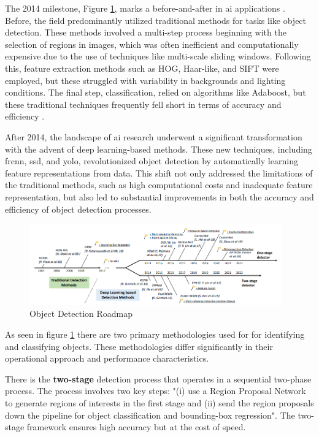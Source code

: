 The 2014 milestone, Figure \ref{fig:stage-detectors}, marks a before-and-after in \ac{ai} applications \cite{rfc22}. Before, the field predominantly utilized traditional methods for tasks like object detection. These methods involved a multi-step process beginning with the selection of regions in images, which was often inefficient and computationally expensive due to the use of techniques like multi-scale sliding windows. Following this, feature extraction methods such as HOG, Haar-like, and SIFT were employed, but these struggled with variability in backgrounds and lighting conditions. The final step, classification, relied on algorithms like Adaboost, but these traditional techniques frequently fell short in terms of accuracy and efficiency \cite{rfc9}.

After 2014, the landscape of \ac{ai} research underwent a significant transformation with the advent of deep learning-based methods. These new techniques, including \ac{frcnn}, \ac{ssd}, and \ac{yolo}, revolutionized object detection by automatically learning feature representations from data. This shift not only addressed the limitations of the traditional methods, such as high computational costs and inadequate feature representation, but also led to substantial improvements in both the accuracy and efficiency of object detection processes.

\begin{figure}[h]
    \centering 
    \includegraphics[width=0.97\textwidth]{figs/roadmap-stage.png} 
    \caption{Object Detection Roadmap~\cite{rfc22}}
    \label{fig:stage-detectors}
\end{figure}

As seen in figure \ref{fig:stage-detectors} there are two primary methodologies used for for identifying and 
classifying objects.
These methodologies differ significantly in their operational approach and performance characteristics.

There is the \textbf{two-stage} detection process that operates in a sequential two-phase process. The process involves two key steps: "(i) use a Region Proposal Network to generate regions of interests in the first stage and (ii) send the region proposals down the pipeline for object classification and bounding-box regression"\cite{rfc21}. The two-stage framework ensures high accuracy but at the cost of speed.

